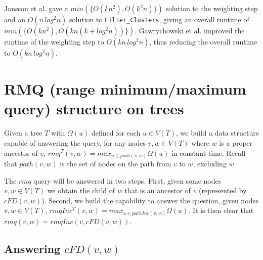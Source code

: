 \documentclass{article}
\begin{document}
    Jansson et al. \cite{jansson2018algorithms} gave a $min(\{O(kn^2), O(k^2n)\})$ solution to the weighting step and an $O(n\,log^2n)$ solution to \texttt{Filter\_Clusters}, giving an overall runtime of $min(\{O(kn^2), O(kn(k + log^2n))\})$. Gawrychowski et al. \cite{gawrychowski2017faster} improved the runtime of the weighting step to $O(kn\,log^2n)$, thus reducing the overall runtime to $O(kn\,log^2n)$.

    \section{RMQ (range minimum/maximum query) structure on trees}
    \label{sec:rmqstructure}

    Given a tree $T$ with $\Omega(u)$ defined for each $u \in V(T)$, we build a data structure capable of answering the query, for any nodes $v, w \in V(T)$ where $w$ is a proper ancestor of $v$, $rmq^T(v, w) = max_{u \in path(v, w)}\Omega(u)$ in constant time. Recall that $path(v, w)$ is the set of nodes on the path from $v$ to $w$, excluding $w$.

    The $rmq$ query will be answered in two steps. First, given some nodes $v, w \in V(T)$ we obtain the child of $w$ that is an ancestor of $v$ (represented by $cFD(v, w)$). Second, we build the capability to answer the question, given nodes $v, w \in V(T)$, $rmqInc^T(v, w) = max_{u \in pathInc(v, w)}\Omega(u)$. It is then clear that $rmq(v, w) = rmqInc(v, cFD(v, w))$.

    \subsection{Answering $cFD(v, w)$}
\end{document}
